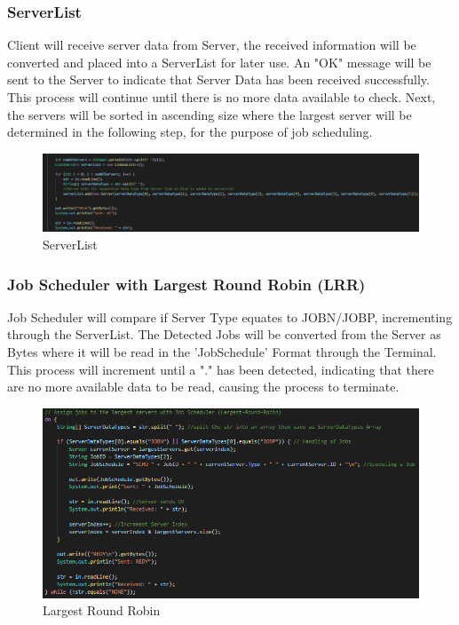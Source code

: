 \documentclass[a4paper]{article} %
\begin{document}
\subsubsection{ServerList}
Client will receive server data from Server, the received information will be converted and placed into a ServerList for later use. An "OK" message will be sent to the Server to indicate that Server Data has been received successfully. This process will continue until there is no more data available to check. Next, the servers will be sorted in ascending size where the largest server will be determined in the following step, for the purpose of job scheduling.

\begin{figure}[H]
\begin{center}
\includegraphics[scale=0.5]{ServerData.png}
\caption{ServerList}
\end{center}
\end{figure}

\subsubsection{Job Scheduler with Largest Round Robin (LRR)}
Job Scheduler will compare if Server Type equates to JOBN/JOBP, incrementing through the ServerList. The Detected Jobs will be converted from the Server as Bytes where it will be read in the 'JobSchedule' Format through the Terminal. This process will increment until a "." has been detected, indicating that there are no more available data to be read, causing the process to terminate.

\begin{figure}[H]
\begin{center}
\includegraphics[scale=0.5]{LRR.png}
\caption{Largest Round Robin}
\end{center}
\end{figure}
\end{document}
